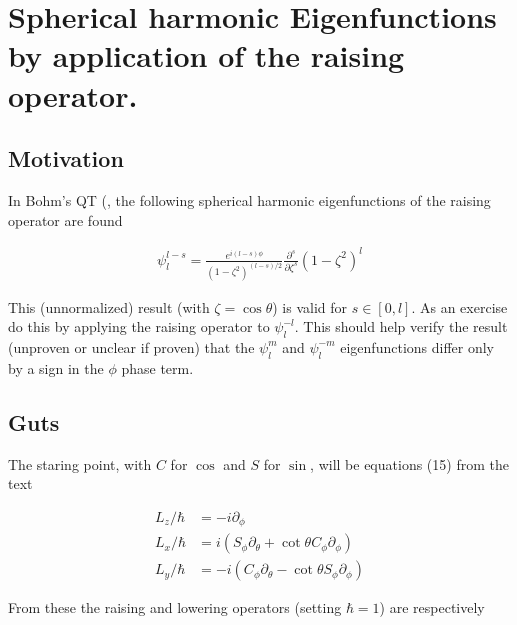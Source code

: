 %

\chapter{Spherical harmonic Eigenfunctions by application of the raising operator.}
\label{chap:sphericalHarmonicRaising}
{}
\date{Aug 18, 2009}

\beginArtNoToc

\section{Motivation}

In Bohm's QT (\citep{bohm1989qt}, the following spherical harmonic eigenfunctions of the raising operator are found

\begin{align}\label{eqn:sphericalHarmonicRaising:foo0}
\psi_l^{l-s} = \frac{e^{i(l-s)\phi}}{(1-\zeta^2)^{(l-s)/2}} \frac{\partial^s}{\partial \zeta^s} (1-\zeta^2)^l
\end{align}

This (unnormalized) result (with $\zeta = \cos\theta$) is valid for $s \in [0,l]$.  As an exercise do this by applying the raising operator to $\psi_l^{-l}$.  This should help verify the result (unproven or unclear if proven) that the $\psi_l^m$ and $\psi_l^{-m}$ eigenfunctions differ only by a sign in the $\phi$ phase term.

\section{Guts}

The staring point, with $C$ for $\cos$ and $S$ for $\sin$, will be equations (15) from the text

\begin{align*}
L_z/\hbar &= -i \partial_\phi \\
L_x/\hbar &= i (S_\phi \partial_\theta + \cot\theta C_\phi \partial_\phi) \\
L_y/\hbar &= -i (C_\phi \partial_\theta - \cot\theta S_\phi \partial_\phi)
\end{align*}

From these the raising and lowering operators (setting $\hbar=1$) are respectively

